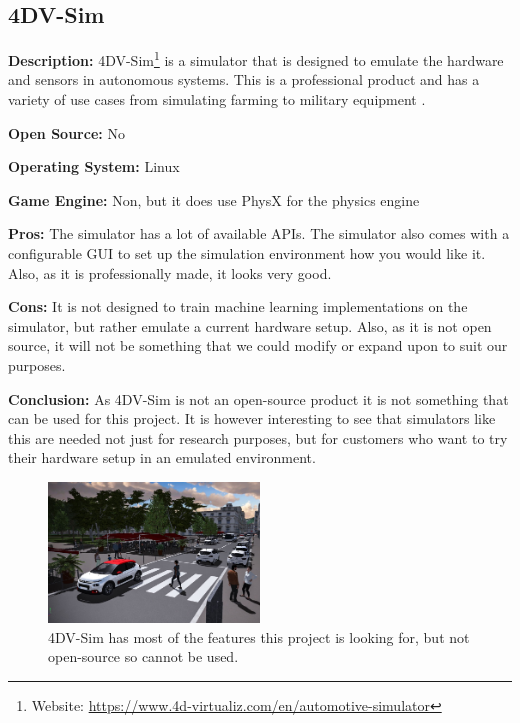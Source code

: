 \subsection{4DV-Sim}
\textbf{Description:} 4DV-Sim\footnote{Website: \url{https://www.4d-virtualiz.com/en/automotive-simulator}} is a simulator that is designed to emulate the hardware and sensors in autonomous systems. This is a professional product and has a variety of use cases from simulating farming to military equipment \cite{4dv-simulator}.

\textbf{Open Source:} No

\textbf{Operating System:} Linux

\textbf{Game Engine:} Non, but it does use PhysX for the physics engine

\textbf{Pros:} The simulator has a lot of available APIs. The simulator also comes with a configurable GUI to set up the simulation environment how you would like it. Also, as it is professionally made, it looks very good.   

\textbf{Cons:} It is not designed to train machine learning implementations on the simulator, but rather emulate a current hardware setup. Also, as it is not open source, it will not be something that we could modify or expand upon to suit our purposes. 

\textbf{Conclusion:} As 4DV-Sim is not an open-source product it is not something that can be used for this project. It is however interesting to see that simulators like this are needed not just for research purposes, but for customers who want to try their hardware setup in an emulated environment.


\begin{figure}[H]
    \centering
    \includegraphics[width=0.5\textwidth]{03_Background/Appendix/Simulators/4DV-Sim.jpg}
    \caption[4DV-Sim]{4DV-Sim has most of the features this project is looking for, but not open-source so cannot be used.}
\end{figure}

